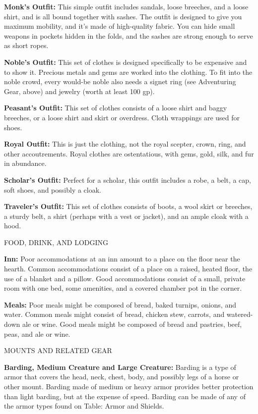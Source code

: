 \documentclass{article}
\begin{document}
\textbf{Monk's Outfit:} This simple outfit includes sandals, loose breeches, and 
a loose shirt, and is all bound together with sashes. The outfit is designed to 
give you maximum mobility, and it's made of high-quality fabric. You can hide small 
weapons in pockets hidden in the folds, and the sashes are strong enough to serve 
as short ropes.

\textbf{Noble's Outfit:} This set of clothes is designed specifically to be expensive 
and to show it. Precious metals and gems are worked into the clothing. To fit into 
the noble crowd, every would-be noble also needs a signet ring (see Adventuring 
Gear, above) and jewelry (worth at least 100 gp).

\textbf{Peasant's Outfit:} This set of clothes consists of a loose shirt and baggy 
breeches, or a loose shirt and skirt or overdress. Cloth wrappings are used for 
shoes.

\textbf{Royal Outfit:} This is just the clothing, not the royal scepter, crown, 
ring, and other accoutrements. Royal clothes are ostentatious, with gems, gold, 
silk, and fur in abundance.

\textbf{Scholar's Outfit: }Perfect for a scholar, this outfit includes a robe, 
a belt, a cap, soft shoes, and possibly a cloak.

\textbf{Traveler's Outfit:} This set of clothes consists of boots, a wool skirt 
or breeches, a sturdy belt, a shirt (perhaps with a vest or jacket), and an ample 
cloak with a hood.

\vspace{12pt}
FOOD, DRINK, AND LODGING

\textbf{Inn:} Poor accommodations at an inn amount to a place on the floor near 
the hearth. Common accommodations consist of a place on a raised, heated floor, 
the use of a blanket and a pillow. Good accommodations consist of a small, private 
room with one bed, some amenities, and a covered chamber pot in the corner.

\textbf{Meals:} Poor meals might be composed of bread, baked turnips, onions, and 
water. Common meals might consist of bread, chicken stew, carrots, and watered-down 
ale or wine. Good meals might be composed of bread and pastries, beef, peas, and 
ale or wine.

\vspace{12pt}
MOUNTS AND RELATED GEAR

\textbf{Barding, Medium Creature and Large Creature: }Barding is a type of armor 
that covers the head, neck, chest, body, and possibly legs of a horse or other 
mount. Barding made of medium or heavy armor provides better protection than light 
barding, but at the expense of speed. Barding can be made of any of the armor types 
found on Table: Armor and Shields.
\end{document}
